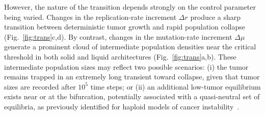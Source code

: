 \documentclass[10pt, aps, rmp,  twocolumn, superscriptaddress, floatfix, showkeys]{revtex4-2}
\begin{document}


However, the nature of the transition depends strongly on the control parameter being varied. Changes in the replication-rate increment $\Delta r$ produce a sharp transition between deterministic tumor growth and rapid population collapse (Fig.~\ref{fig:trans}c,d). By contrast, changes in the mutation-rate increment $\Delta \mu$ generate a prominent cloud of intermediate population densities near the critical threshold in both solid and liquid architectures (Fig.~\ref{fig:trans}a,b). These intermediate population sizes may reflect two possible scenarios: (i) the tumor remains trapped in an extremely long transient toward collapse, given that tumor sizes are recorded after $10^5$ time steps; or (ii) an additional low-tumor equilibrium exists near or at the bifurcation, potentially associated with a quasi-neutral set of equilibria, as previously identified for haploid models of cancer instability~\cite{Sardanyes2017JMB,Sardanyes2018RSOS,Sardanyes2018SciRep}.
\end{document}
